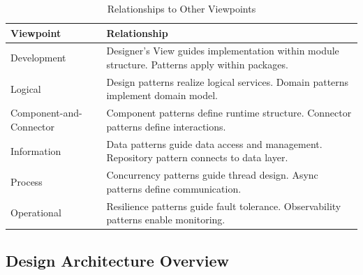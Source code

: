\documentclass[11pt,letterpaper]{article}
\begin{document}
\begin{table}[H]
\centering
\caption{Relationships to Other Viewpoints}
\begin{tabular}{@{}L{3.5cm}L{10.5cm}@{}}
\toprule
\textbf{Viewpoint} & \textbf{Relationship} \\
\midrule
Development & Designer's View guides implementation within module structure. Patterns apply within packages. \\
\addlinespace
Logical & Design patterns realize logical services. Domain patterns implement domain model. \\
\addlinespace
Component-and-Connector & Component patterns define runtime structure. Connector patterns define interactions. \\
\addlinespace
Information & Data patterns guide data access and management. Repository pattern connects to data layer. \\
\addlinespace
Process & Concurrency patterns guide thread design. Async patterns define communication. \\
\addlinespace
Operational & Resilience patterns guide fault tolerance. Observability patterns enable monitoring. \\
\bottomrule
\end{tabular}
\end{table}

\subsection{Design Architecture Overview}
\end{document}
